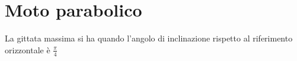 \section{Moto parabolico}

La gittata massima si ha quando l'angolo di inclinazione rispetto al riferimento orizzontale è $\frac{\pi}{4}$
